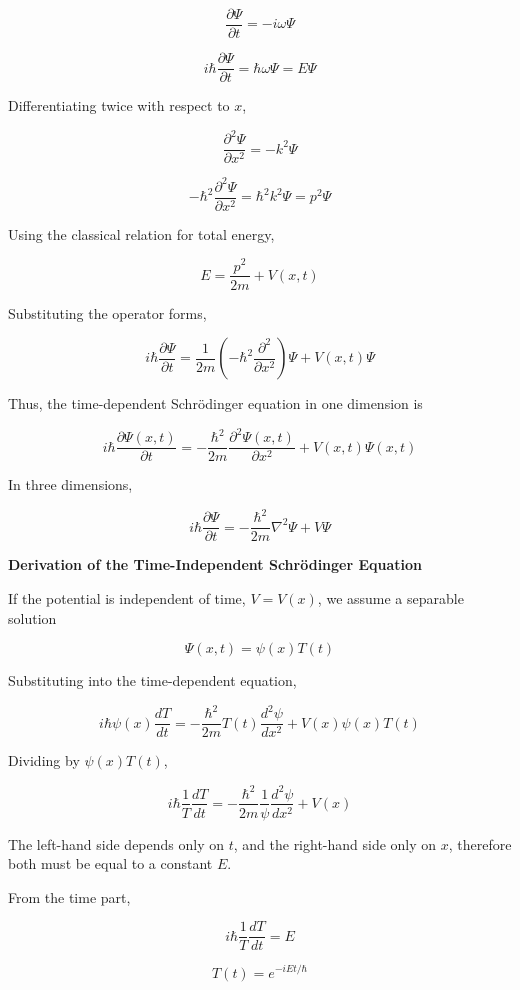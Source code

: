\documentclass[a4paper, 12pt]{article}
\begin{document}
\[
\frac{\partial \Psi}{\partial t} = -i\omega \Psi
\]

\[
i\hbar \frac{\partial \Psi}{\partial t} = \hbar \omega \Psi = E\Psi
\]

Differentiating twice with respect to $x$,

\[
\frac{\partial^2 \Psi}{\partial x^2} = -k^2 \Psi
\]

\[
-\hbar^2 \frac{\partial^2 \Psi}{\partial x^2} = \hbar^2 k^2 \Psi = p^2 \Psi
\]

Using the classical relation for total energy,

\[
E = \frac{p^2}{2m} + V(x,t)
\]

Substituting the operator forms,

\[
i\hbar \frac{\partial \Psi}{\partial t}
=
\frac{1}{2m}
\left(
-\hbar^2 \frac{\partial^2}{\partial x^2}
\right)\Psi
+
V(x,t)\Psi
\]

Thus, the time-dependent Schrödinger equation in one dimension is

\[
i\hbar \frac{\partial \Psi(x,t)}{\partial t}
=
-\frac{\hbar^2}{2m}
\frac{\partial^2 \Psi(x,t)}{\partial x^2}
+
V(x,t)\Psi(x,t)
\]

In three dimensions,

\[
i\hbar \frac{\partial \Psi}{\partial t}
=
-\frac{\hbar^2}{2m}\nabla^2 \Psi
+
V\Psi
\]

\vspace{0.4cm}

\textbf{Derivation of the Time-Independent Schrödinger Equation}

If the potential is independent of time, $V = V(x)$, we assume a separable solution

\[
\Psi(x,t) = \psi(x)T(t)
\]

Substituting into the time-dependent equation,

\[
i\hbar \psi(x)\frac{dT}{dt}
=
-\frac{\hbar^2}{2m}T(t)\frac{d^2\psi}{dx^2}
+
V(x)\psi(x)T(t)
\]

Dividing by $\psi(x)T(t)$,

\[
i\hbar \frac{1}{T}\frac{dT}{dt}
=
-\frac{\hbar^2}{2m}\frac{1}{\psi}\frac{d^2\psi}{dx^2}
+
V(x)
\]

The left-hand side depends only on $t$, and the right-hand side only on $x$, therefore both must be equal to a constant $E$.

From the time part,

\[
i\hbar \frac{1}{T}\frac{dT}{dt} = E
\]

\[
T(t) = e^{-iEt/\hbar}
\]
\end{document}
